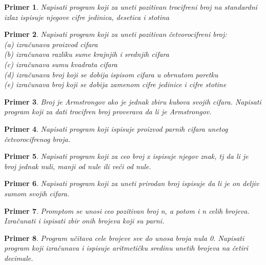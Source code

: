 \documentclass[a4paper]{article}
\newtheorem{primer}{Primer}[section]
\begin{document}
\begin{primer}
Napisati program koji za uneti pozitivan trocifreni broj na
standardni izlaz ispisuje njegove cifre jedinica, desetica i stotina
\end{primer}

\begin{primer}
Napisati program koji za uneti pozitivan četvorocifreni
broj:\\
(a) izračunava proizvod cifara\\
(b) izračunava razliku sume krajnjih i srednjih cifara\\
(c) izračunava sumu kvadrata cifara\\
(d) izračunava broj koji se dobija ispisom cifara u obrnutom poretku\\
(e) izračunava broj koji se dobija zamenom cifre jedinice i cifre stotine\\
\end{primer}

\begin{primer}
Broj je Armstrongov ako je jednak zbiru kubova svojih
cifara. Napisati program koji za dati trocifren broj proverava da li je Armstrongov.
\end{primer}

\begin{primer}
Napisati program koji ispisuje proizvod parnih cifara unetog
četvorocifrenog broja.
\end{primer}

\begin{primer}
Napisati program koji za ceo broj x ispisuje njegov
znak, tj da li je broj jednak nuli, manji od nule ili veći od nule.
\end{primer}

\begin{primer}
Napisati program koji za uneti prirodan broj ispisuje da li
je on deljiv sumom svojih cifara.
\end{primer}

\begin{primer}
Promptom se unosi ceo pozitivan broj n, a potom i n celih
brojeva. Izračunati i ispisati zbir onih brojeva koji su parni.
\end{primer}

\begin{primer}
Program učitava cele brojeve sve do unosa broja nula 0.
Napisati program koji izračunava i ispisuje aritmetičku sredinu unetih brojeva na
četiri decimale.
\end{primer}
\end{document}
